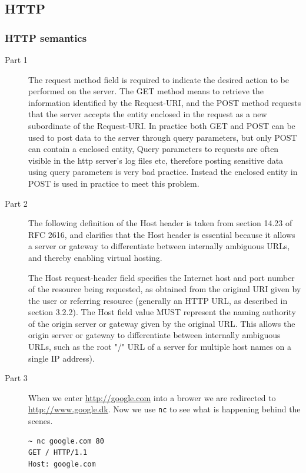 \documentclass[a4paper]{article}
\begin{document}
\subsection{HTTP}
\subsubsection{HTTP semantics}
\begin{description}
    \item[Part 1] The request method field is required to indicate the desired
        action to be performed on the server. The GET method means to retrieve
        the information identified by the Request-URI, and the POST method
        requests that the server accepts the entity enclosed in the request as
        a new subordinate of the Request-URI. In practice both GET and POST can
        be used to post data to the server through query parameters, but only
        POST can contain a enclosed entity, Query parameters to requests are
        often visible in the http server's log files etc, therefore posting
        sensitive data using query parameters is very bad practice. Instead the
        enclosed entity in POST is used in practice to meet this problem.

    \item[Part 2] The following definition of the Host header is taken from
        section 14.23 of RFC 2616, and clarifies that the Host header is
        essential because it allows a server or gateway to differentiate
        between internally ambiguous URLs, and thereby enabling virtual
        hosting.

        The Host request-header field specifies the Internet host and port
        number of the resource being requested, as obtained from the original
        URI given by the user or referring resource (generally an HTTP URL, as
        described in section 3.2.2). The Host field value MUST represent the
        naming authority of the origin server or gateway given by the original
        URL. This allows the origin server or gateway to differentiate between
        internally ambiguous URLs, such as the root "/" URL of a server for
        multiple host names on a single IP address).

    \item[Part 3] When we enter \url{http://google.com} into a brower we are
        redirected to \url{http://www.google.dk}. Now we use \texttt{nc} to see
        what is happening behind the scenes.

\begin{lstlisting}
~ nc google.com 80                                                                    
GET / HTTP/1.1
Host: google.com


\end{lstlisting}
\end{description}
\end{document}

